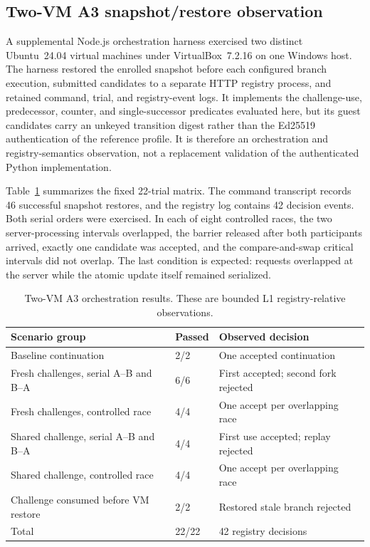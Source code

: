 \documentclass[11pt]{article}
\begin{document}
\subsection{Two-VM A3 snapshot/restore observation}
A supplemental Node.js orchestration harness exercised two distinct Ubuntu~24.04 virtual machines under VirtualBox~7.2.16 on one Windows host. The harness restored the enrolled snapshot before each configured branch execution, submitted candidates to a separate HTTP registry process, and retained command, trial, and registry-event logs. It implements the challenge-use, predecessor, counter, and single-successor predicates evaluated here, but its guest candidates carry an unkeyed transition digest rather than the Ed25519 authentication of the reference profile. It is therefore an orchestration and registry-semantics observation, not a replacement validation of the authenticated Python implementation.

Table~\ref{tab:a3-vm} summarizes the fixed 22-trial matrix. The command transcript records 46 successful snapshot restores, and the registry log contains 42 decision events. Both serial orders were exercised. In each of eight controlled races, the two server-processing intervals overlapped, the barrier released after both participants arrived, exactly one candidate was accepted, and the compare-and-swap critical intervals did not overlap. The last condition is expected: requests overlapped at the server while the atomic update itself remained serialized.

\begin{table}[t]
\centering
\caption{Two-VM A3 orchestration results. These are bounded L1 registry-relative observations.}
\label{tab:a3-vm}
\small
\begin{tabular}{>{\raggedright\arraybackslash}p{}p{}p{}}
\toprule
Scenario group & Passed & Observed decision\\
\midrule
Baseline continuation & 2/2 & One accepted continuation\\
Fresh challenges, serial A--B and B--A & 6/6 & First accepted; second fork rejected\\
Fresh challenges, controlled race & 4/4 & One accept per overlapping race\\
Shared challenge, serial A--B and B--A & 4/4 & First use accepted; replay rejected\\
Shared challenge, controlled race & 4/4 & One accept per overlapping race\\
Challenge consumed before VM restore & 2/2 & Restored stale branch rejected\\
\midrule
Total & 22/22 & 42 registry decisions\\
\bottomrule
\end{tabular}
\end{table}
\end{document}
